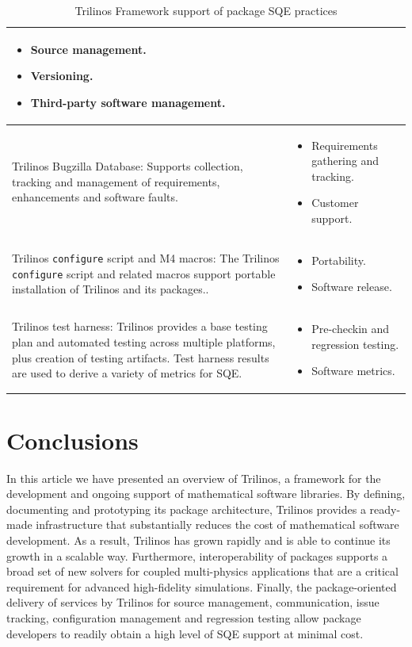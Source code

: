 \documentclass[12pt,relax]{TPA}
\begin{document}
\begin{table}
\begin{center}
\begin{tabular}{|p{1.75in}|p{2.75in}|}
\begin{itemize}
\item Source management. 
\item Versioning.
\item Third-party software management.
\end{itemize}\\\hline
Trilinos Bugzilla Database:  Supports collection, tracking and
management of requirements,
enhancements and software faults.&
\begin{itemize}
\item Requirements gathering and tracking.
\item Customer support.
\end{itemize}\\\hline
Trilinos {\tt configure} script and M4 macros: The Trilinos {\tt
configure}  script and related macros support
portable installation of Trilinos and its packages.. &
\begin{itemize}
\item Portability.
\item Software release.
\end{itemize}\\\hline
Trilinos test harness: Trilinos provides a base testing plan and 
automated testing across
multiple platforms, plus creation of testing artifacts. Test harness
results are used to derive a variety of metrics for SQE.&
\begin{itemize}
\item Pre-checkin and regression testing.
\item Software metrics. 
\end{itemize}\\\hline
\end{tabular}
\caption{\label{table:practices} Trilinos Framework support of package
SQE practices}
\end{center}
\end{table}


\section{Conclusions}

In this article we have presented an overview of Trilinos, a 
framework for the development and ongoing support of mathematical
software libraries.  By defining, documenting and prototyping its
package architecture, Trilinos 
provides a ready-made infrastructure that substantially reduces the cost of
mathematical software development.  As a result, Trilinos
has grown rapidly and is able to continue its growth in a scalable
way.  Furthermore, interoperability of packages supports a broad set
of new solvers for coupled multi-physics
applications that are a critical requirement for advanced high-fidelity
simulations.  Finally, the package-oriented delivery of services by
Trilinos for source management, communication, issue tracking,
configuration management and regression testing allow package
developers to readily obtain a high level of SQE support at minimal
cost. 
\end{document}
